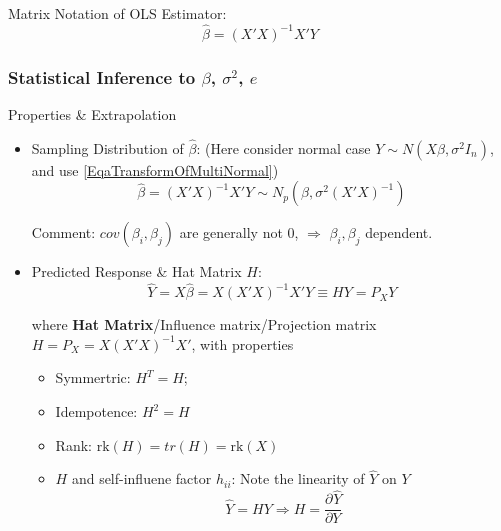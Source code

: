 \begin{point}
    Matrix Notation of OLS Estimator:
    \begin{equation}
        \hat{\beta }=(X'X)^{-1}X'Y 
    \end{equation}
\end{point}


\subsubsection{Statistical Inference to $ \beta  $, $ \sigma ^2 $, $ e $}\label{SubSubSectionStatisticalInferenceInMultiLRA}
    Properties \& Extrapolation
\begin{itemize}[topsep=2pt,itemsep=2pt]
    \item Sampling Distribution of $ \hat{\beta } $: (Here consider normal case $ Y\sim N(X\beta ,\sigma^2I_n) $, and use \autoref{EqaTransformOfMultiNormal}) 
    \begin{equation}\label{EqaDistributionOfMultiVariateBeta}
        \hat{\beta }=(X'X)^{-1}X'Y \sim N_p(\beta,\sigma^2(X'X)^{-1})
    \end{equation}

    Comment: $ cov(\beta_i,\beta_j ) $ are generally not 0, $ \Rightarrow $ $ \beta _i,\beta _j $ dependent.
    \item Predicted Response \& Hat Matrix $ H $:
    \begin{equation}
        \hat{Y}=X\hat{\beta }=X(X'X)^{-1}X'Y\equiv  HY=P_XY
    \end{equation}

    where \textbf{Hat Matrix}/Influence matrix/Projection matrix $ H=P_X=X(X'X)^{-1}X' $, with properties
    \begin{itemize}[topsep=2pt,itemsep=2pt]
        \item Symmertric: $ H^T=H $;
        \item Idempotence: $ H^2=H $
        \item Rank: $ \mathrm{rk}(H)=tr(H)=\mathrm{rk}(X)   $
        \item $ H $ and self-influene factor $ h_{ii} $: Note the linearity of $ \hat{Y} $ on $ Y $
        \begin{equation}
            \hat{Y}=HY \Rightarrow H=\dfrac{\partial^{} \hat{Y}}{\partial Y^{}}
        \end{equation} 
    

\end{itemize}
\end{itemize}
